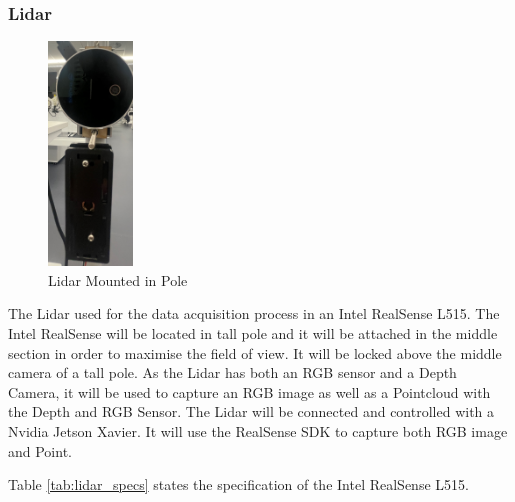 \documentclass[12pt]{report}
\begin{document}
\subsubsection*{Lidar}

\begin{figure}
  \begin{center}
    \includegraphics[width=0.2\textwidth]{IMG_5886_cropped.jpg}
  \end{center}                          
  \caption{Lidar Mounted in Pole}
  \label{fig:lidar_mounted}
\end{figure}
The Lidar used for the data acquisition process in an Intel RealSense L515.
The Intel RealSense will be located in tall pole and it will be attached in the middle section in order to maximise the field of view. It will be locked above the middle camera of a tall pole.
As the Lidar has both an RGB sensor and a Depth Camera, it will be used to capture an RGB image as well as a Pointcloud with the Depth and RGB Sensor.
The Lidar will be connected and controlled with a Nvidia Jetson Xavier. It will use the RealSense SDK to capture both RGB image and Point.

Table \ref{tab:lidar_specs} states the specification of the Intel RealSense L515. 
\end{document}
